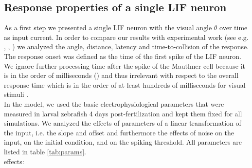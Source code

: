 \documentclass[a4paper,10pt,hidelinks]{scrartcl}
\begin{document}
	\subsection{Response properties of a single LIF neuron}
	As a first step we presented a single LIF neuron with the visual angle 
	$\theta$ over time as input current.
	In order to compare our results with experimental work (see e.g. 
	\cite{Bhattacharyya2017}, \cite{Temizer2015}, \cite{Dunn2016}) we analyzed 
	the angle, distance, latency and time-to-collision of the response.
	The response onset was defined as the time of the first spike of the LIF neuron.
	We ignore further processing time after the spike of the Mauthner cell 
	because it is in the order of milliseconds (\cite{Preuss2003}) and thus 
	irrelevant with respect to the overall response time which is in the order 
	of at least hundreds of milliseconds for visual stimuli 
	\citep{Preuss2006}.\\
	In the model, we used the basic electrophysiological parameters that were measured in larval zebrafish 4 days post-fertilization \citep{Koyama2016} and kept them fixed for all simulations.
	We analyzed the effects of parameters of a linear transformation of the input, i.e. the slope and offset and furthermore the effects of noise on the input, on the initial condition, and on the spiking threshold.
	All parameters are listed in table \ref{tab:params}.\\
	effects:
\end{document}
